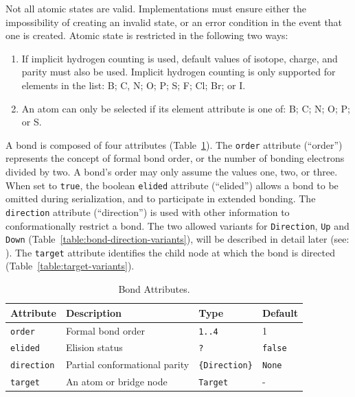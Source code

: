 \documentclass{article}
\def\ttt{\texttt}
\begin{document}
Not all atomic states are valid. Implementations must ensure either the impossibility of creating an invalid state, or an error condition in the event that one is created. Atomic state is restricted in the following two ways:

\begin{enumerate}
    \item{If implicit hydrogen counting is used, default values of isotope, charge, and parity must also be used. Implicit hydrogen counting is only supported for elements in the list: B; C, N; O; P; S; F; Cl; Br; or I.}
    \item{An atom can only be selected if its element attribute is one of: B; C; N; O; P; or S.}
\end{enumerate}

A bond is composed of four attributes (Table~\ref{table:bond-attributes}). The \ttt{order} attribute (\enquote{order}) represents the concept of formal bond order, or the number of bonding electrons divided by two. A bond's order may only assume the values one, two, or three. When set to \ttt{true}, the boolean \ttt{elided} attribute (\enquote{elided}) allows a bond to be omitted during serialization, and to participate in extended bonding. The \ttt{direction} attribute (\enquote{direction}) is used with other information to conformationally restrict a bond. The two allowed variants for \ttt{Direction}, \ttt{Up} and \ttt{Down} (Table~\ref{table:bond-direction-variants}), will be described in detail later (see: ). The \ttt{target} attribute identifies the child node at which the bond is directed (Table~\ref{table:target-variants}).

\begin{table}
\caption{Bond Attributes.}
\centering
\begin{tabular}{l p{3.6cm} l l}
    \hline
    Attribute & Description & Type & Default \\
    \hline
    \ttt{order} & Formal bond order & \ttt{1..4} & 1 \\
    \ttt{elided} & Elision status & \ttt{?} & \ttt{false} \\
    \ttt{direction} & Partial conformational parity & \ttt{\{Direction\}} & \ttt{None} \\
    \ttt{target} & An atom or bridge node & \ttt{Target} & - \\
    \hline
\end{tabular}
\label{table:bond-attributes}
\end{table}
\end{document}
